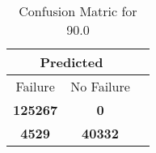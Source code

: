 \begin{table}[] 
\caption{Confusion Matric for 90.0} 
\label{Table: Prediction Accuracy-DMD90.0OnlySunEKF-resetReflectionperfectNoFailurePrediction-Reflection} 
\centering 
\begin{tabular} 
 {@{}ccc@{}} 
\toprule 
\multicolumn{2}{c}{\textbf{Predicted}}
 \\ \midrule 
\multicolumn{1}{|c|}{Failure} & 
\multicolumn{1}{c|}{No Failure}
 \\ \midrule 
\multicolumn{1}{|c|}{\color{green}\textbf{125267}} & 
\multicolumn{1}{c|}{\color{red}\textbf{0}}
 \\ \midrule 
\multicolumn{1}{|c|}{\color{red}\textbf{4529}} & 
\multicolumn{1}{c|}{\color{green}\textbf{40332}}
 \\ \bottomrule 
\end{tabular} 
\end{table} 
